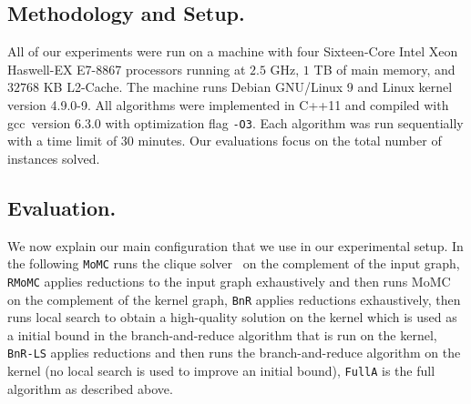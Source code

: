 \documentclass[twoside,leqno,twocolumn]{article}
\begin{document}
\subsection{Methodology and Setup.}
All of our experiments were run on a machine with  four Sixteen-Core Intel Xeon Haswell-EX E7-8867 processors running at $2.5$ GHz, $1$ TB of main memory, and $32768$ KB L2-Cache.
The machine runs Debian GNU/Linux 9 and Linux kernel version 4.9.0-9.
All algorithms were implemented in C++11 and compiled with gcc~version 6.3.0 with optimization flag \texttt{-O3}.
Each algorithm was run sequentially with a time limit of 30 minutes. Our evaluations focus on the total number of instances solved.
\subsection{Evaluation.}
We now explain our main configuration that we use in our experimental setup.
In the following \texttt{MoMC} runs the clique
solver~\cite{DBLP:journals/cor/LiJM17} on the complement of the input graph,
\texttt{RMoMC} applies reductions to the input graph exhaustively and then runs
MoMC on the complement of the kernel graph, \texttt{BnR} applies reductions
exhaustively, then runs local search to obtain a high-quality solution on the
kernel which is used as a initial bound in the branch-and-reduce algorithm that
is run on the kernel, \texttt{BnR-LS} applies reductions and then runs the branch-and-reduce algorithm on the kernel (no local search is used to improve an initial bound), \texttt{FullA} is the full algorithm as described above.


\end{document}
